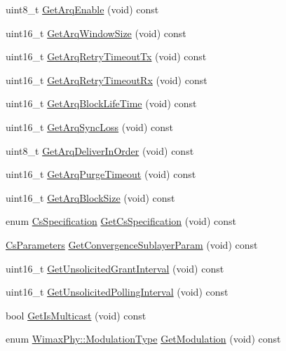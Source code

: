 \begin{DoxyCompactItemize}
\item 
uint8\+\_\+t \hyperlink{classns3_1_1ServiceFlow_a9be205ce3fb404c4a8408e32a626ee2c}{Get\+Arq\+Enable} (void) const 
\item 
uint16\+\_\+t \hyperlink{classns3_1_1ServiceFlow_adc247f65ecb7a3d145b8955c5800ffcd}{Get\+Arq\+Window\+Size} (void) const 
\item 
uint16\+\_\+t \hyperlink{classns3_1_1ServiceFlow_afbeaa6913cd9b7f07c569bb99cb8a758}{Get\+Arq\+Retry\+Timeout\+Tx} (void) const 
\item 
uint16\+\_\+t \hyperlink{classns3_1_1ServiceFlow_a2d1c7d8a60cbc5f19e785d2488f91a94}{Get\+Arq\+Retry\+Timeout\+Rx} (void) const 
\item 
uint16\+\_\+t \hyperlink{classns3_1_1ServiceFlow_a3865d9c65f77dda5ae3be0fc8ae9ec75}{Get\+Arq\+Block\+Life\+Time} (void) const 
\item 
uint16\+\_\+t \hyperlink{classns3_1_1ServiceFlow_ab2d2bb5a57a269c557448677de26d372}{Get\+Arq\+Sync\+Loss} (void) const 
\item 
uint8\+\_\+t \hyperlink{classns3_1_1ServiceFlow_ac7df8ccc7dececaabb9239dbd8478b77}{Get\+Arq\+Deliver\+In\+Order} (void) const 
\item 
uint16\+\_\+t \hyperlink{classns3_1_1ServiceFlow_a3105ec06fd33016def71d8bfe52457b6}{Get\+Arq\+Purge\+Timeout} (void) const 
\item 
uint16\+\_\+t \hyperlink{classns3_1_1ServiceFlow_ab3033fe0138f44b222a5f2e07e095f88}{Get\+Arq\+Block\+Size} (void) const 
\item 
enum \hyperlink{classns3_1_1ServiceFlow_ad87f7547b7c053db4472543e17d21952}{Cs\+Specification} \hyperlink{classns3_1_1ServiceFlow_af31954524fcd0fa30cc95387975fe20c}{Get\+Cs\+Specification} (void) const 
\item 
\hyperlink{classns3_1_1CsParameters}{Cs\+Parameters} \hyperlink{classns3_1_1ServiceFlow_a963dd23a17774180b9dbb7003ec487a7}{Get\+Convergence\+Sublayer\+Param} (void) const 
\item 
uint16\+\_\+t \hyperlink{classns3_1_1ServiceFlow_a377ef7c627d627585a77486c3fcd75a3}{Get\+Unsolicited\+Grant\+Interval} (void) const 
\item 
uint16\+\_\+t \hyperlink{classns3_1_1ServiceFlow_a151f1aa61ab48f9cd3643d6c692c6224}{Get\+Unsolicited\+Polling\+Interval} (void) const 
\item 
bool \hyperlink{classns3_1_1ServiceFlow_a2e745652b720c375dd1f036ada354aba}{Get\+Is\+Multicast} (void) const 
\item 
enum \hyperlink{classns3_1_1WimaxPhy_a044c5d8a48ca992c39c2a946f6e755fa}{Wimax\+Phy\+::\+Modulation\+Type} \hyperlink{classns3_1_1ServiceFlow_a09f1c84bbd6d2a1c7f56e8cfc9cab958}{Get\+Modulation} (void) const 

\end{DoxyCompactItemize}
